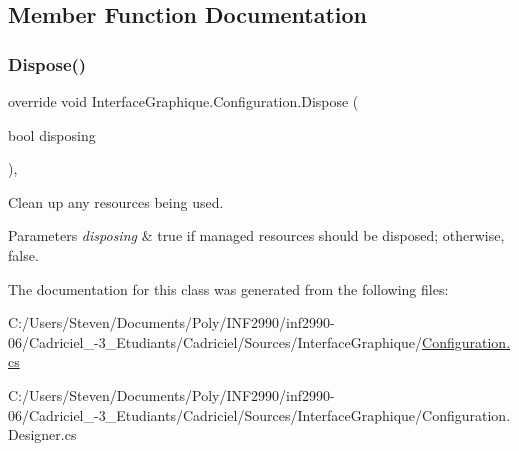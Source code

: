 \subsection{Member Function Documentation}
\hypertarget{class_interface_graphique_1_1_configuration_a0200b084946b5710be7d94f9e8b0385c}{}\label{class_interface_graphique_1_1_configuration_a0200b084946b5710be7d94f9e8b0385c} 
\subsubsection{\texorpdfstring{Dispose()}{Dispose()}}
{\footnotesize\ttfamily override void Interface\+Graphique.\+Configuration.\+Dispose (\begin{DoxyParamCaption}\item[{bool}]{disposing }\end{DoxyParamCaption})\hspace{0.3cm}{\ttfamily [inline]}, {\ttfamily [protected]}}



Clean up any resources being used. 


\begin{DoxyParams}{Parameters}
{\em disposing} & true if managed resources should be disposed; otherwise, false.\\
\hline
\end{DoxyParams}


The documentation for this class was generated from the following files\+:\begin{DoxyCompactItemize}
\item 
C\+:/\+Users/\+Steven/\+Documents/\+Poly/\+I\+N\+F2990/inf2990-\/06/\+Cadriciel\+\_-\/3\+\_\+\+Etudiants/\+Cadriciel/\+Sources/\+Interface\+Graphique/\hyperlink{_configuration_8cs}{Configuration.\+cs}\item 
C\+:/\+Users/\+Steven/\+Documents/\+Poly/\+I\+N\+F2990/inf2990-\/06/\+Cadriciel\+\_-\/3\+\_\+\+Etudiants/\+Cadriciel/\+Sources/\+Interface\+Graphique/Configuration.\+Designer.\+cs\end{DoxyCompactItemize}

